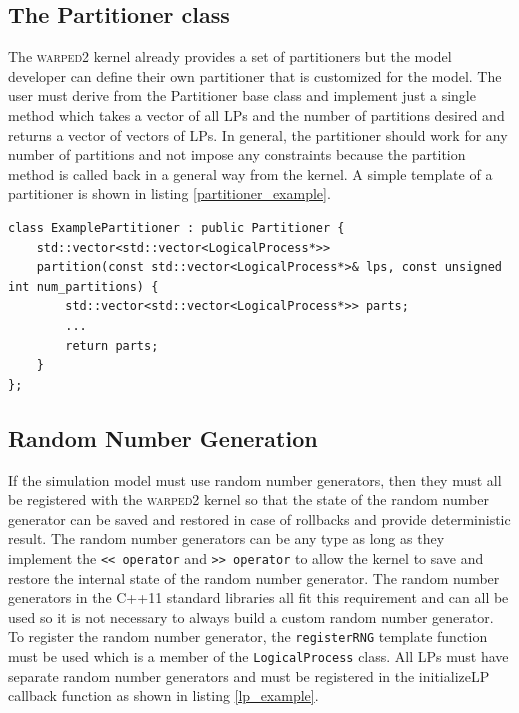 \documentclass[11pt]{book}
\begin{document}
\subsection{The Partitioner class}\label{partitioner}

The \textsc{warped2} kernel already provides a set of partitioners but the model developer can define
their own partitioner that is customized for the model.  The user must derive from the Partitioner
base class and implement just a single method which takes a vector of all LPs and the number of
partitions desired and returns a vector of vectors of LPs.  In general, the partitioner should
work for any number of partitions and not impose any constraints because the partition method
is called back in a general way from the kernel.  A simple template of a partitioner is shown in
listing \ref{partitioner_example}.

\begin{lstlisting}[caption=Example \textsc{warped2} Partitioner Definition, label=partitioner_example, float]
class ExamplePartitioner : public Partitioner {
    std::vector<std::vector<LogicalProcess*>>
    partition(const std::vector<LogicalProcess*>& lps, const unsigned int num_partitions) {
        std::vector<std::vector<LogicalProcess*>> parts;
        ...
        return parts;
    }
};
\end{lstlisting}

\subsection{Random Number Generation}

If the simulation model must use random number generators, then they must all be registered
with the \textsc{warped2} kernel so that the state of the random number generator can be saved and
restored in case of rollbacks and provide deterministic result.  The random number generators
can be any type as long as they implement the \texttt{<< operator} and \texttt{>> operator} to
allow the kernel to save and restore the internal state of the random number generator.  The
random number generators in the C++11 standard libraries\cite{c++11-rng} all fit this requirement
and can all be used so it is not necessary to always build a custom random number generator.  To
register the random number generator, the \texttt{registerRNG} template function must be used which is
a member of the \texttt{LogicalProcess} class.  All LPs must have separate random number generators and
must be registered in the initializeLP callback function as shown in listing \ref{lp_example}.
\end{document}
